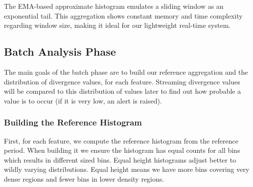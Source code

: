 \documentclass[sigconf]{acmart}
\begin{document}
The EMA-based approximate histogram emulates a sliding window as an exponential tail. This aggregation shows constant memory and time complexity regarding window size, making it ideal for our lightweight real-time system.

\subsection{Batch Analysis Phase} \label{sec:batch-phase}
The main goals of the batch phase are to build our reference aggregation and the distribution of divergence values, for each feature. Streaming divergence values will be compared to this distribution of values later to find out how probable a value is to occur (if it is very low, an alert is raised).

\subsubsection{Building the Reference Histogram}
First, for each feature, we compute the reference histogram from the reference period. When building it we ensure the histogram has equal counts for all bins which results in different sized bins. Equal height histograms adjust better to wildly varying distributions. Equal height means we have more bins covering very dense regions and fewer bins in lower density regions. 
\end{document}
